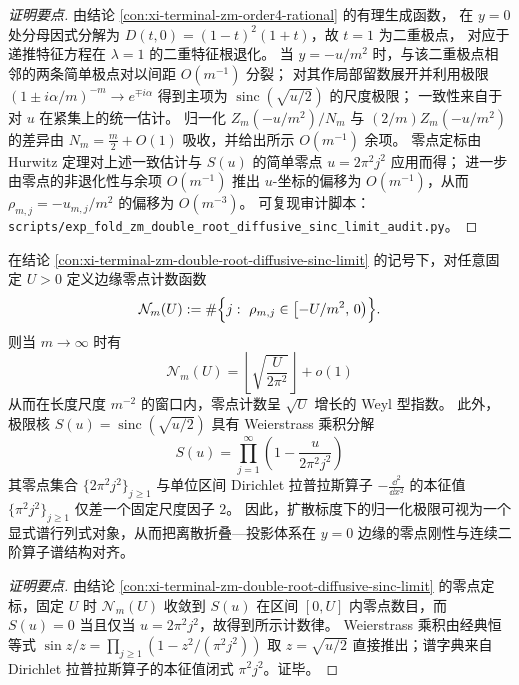 \begin{proof}[证明要点]
由结论 \ref{con:xi-terminal-zm-order4-rational} 的有理生成函数，
在 \(y=0\) 处分母因式分解为 \(D(t,0)=(1-t)^2(1+t)\)，故 \(t=1\) 为二重极点，
对应于递推特征方程在 \(\lambda=1\) 的二重特征根退化。
当 \(y=-u/m^2\) 时，与该二重极点相邻的两条简单极点对以间距 \(O(m^{-1})\) 分裂；
对其作局部留数展开并利用极限
\(
(1\pm i\alpha/m)^{-m}\to e^{\mp i\alpha}
\)
得到主项为 \(\operatorname{sinc}(\sqrt{u/2})\) 的尺度极限；
一致性来自于对 \(u\) 在紧集上的统一估计。
归一化 \(Z_m(-u/m^2)/N_m\) 与 \((2/m)Z_m(-u/m^2)\) 的差异由 \(N_m=\frac m2+O(1)\) 吸收，并给出所示 \(O(m^{-1})\) 余项。
零点定标由 Hurwitz 定理对上述一致估计与 \(S(u)\) 的简单零点 \(u=2\pi^{2}j^{2}\) 应用而得；
进一步由零点的非退化性与余项 \(O(m^{-1})\) 推出 \(u\)-坐标的偏移为 \(O(m^{-1})\)，从而 \(\rho_{m,j}=-u_{m,j}/m^2\) 的偏移为 \(O(m^{-3})\)。
可复现审计脚本：\texttt{scripts/exp\_fold\_zm\_double\_root\_diffusive\_sinc\_limit\_audit.py}。
\end{proof}

\begin{conclusion}\label{con:xi-terminal-zm-diffusive-edge-weyl-spectral-determinant}
在结论 \ref{con:xi-terminal-zm-double-root-diffusive-sinc-limit} 的记号下，对任意固定 \(U>0\) 定义边缘零点计数函数
\[
\mathcal N_m(U):=\#\Bigl\{j:\ \rho_{m,j}\in\bigl[-U/m^2,\,0\bigr)\Bigr\}.
\]
则当 \(m\to\infty\) 时有
\[
\boxed{\;
\mathcal N_m(U)=\left\lfloor \sqrt{\frac{U}{2\pi^2}}\right\rfloor+o(1)\;}
\]
从而在长度尺度 \(m^{-2}\) 的窗口内，零点计数呈 \(\sqrt{U}\) 增长的 Weyl 型指数。
此外，极限核 \(S(u)=\operatorname{sinc}(\sqrt{u/2})\) 具有 Weierstrass 乘积分解
\[
\boxed{\;
S(u)=\prod_{j=1}^{\infty}\left(1-\frac{u}{2\pi^2 j^2}\right)\;}
\]
其零点集合 \(\{2\pi^2 j^2\}_{j\ge 1}\) 与单位区间 Dirichlet 拉普拉斯算子 \(-\frac{\dd^2}{\dd x^2}\) 的本征值 \(\{\pi^2 j^2\}_{j\ge 1}\) 仅差一个固定尺度因子 \(2\)。
因此，扩散标度下的归一化极限可视为一个显式谱行列式对象，从而把离散折叠—投影体系在 \(y=0\) 边缘的零点刚性与连续二阶算子谱结构对齐。
\end{conclusion}
\begin{proof}[证明要点]
由结论 \ref{con:xi-terminal-zm-double-root-diffusive-sinc-limit} 的零点定标，固定 \(U\) 时 \(\mathcal N_m(U)\) 收敛到 \(S(u)\) 在区间 \([0,U]\) 内零点数目，而 \(S(u)=0\) 当且仅当 \(u=2\pi^2 j^2\)，故得到所示计数律。
Weierstrass 乘积由经典恒等式 \(\sin z/z=\prod_{j\ge 1}(1-z^2/(\pi^2 j^2))\) 取 \(z=\sqrt{u/2}\) 直接推出；谱字典来自 Dirichlet 拉普拉斯算子的本征值闭式 \(\pi^2 j^2\)。证毕。
\end{proof}

